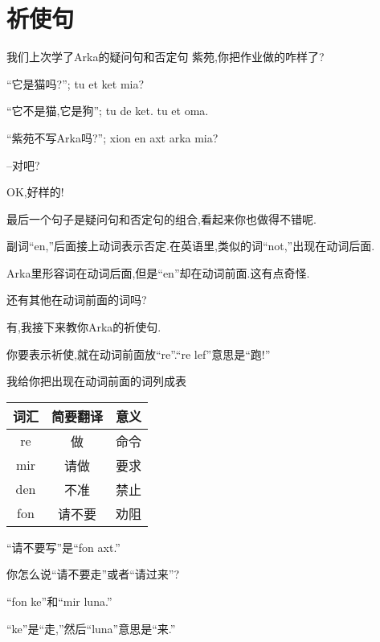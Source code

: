 \chapter[祈使句]{祈使句}

 
我们上次学了Arka的疑问句和否定句
紫苑,你把作业做的咋样了?


``它是猫吗?''; tu et ket mia?

``它不是猫,它是狗''; tu de ket. tu et oma.

``紫苑不写Arka吗?''; xion en axt arka mia?

--对吧?


OK,好样的!

最后一个句子是疑问句和否定句的组合,看起来你也做得不错呢.


副词``en,''后面接上动词表示否定.在英语里,类似的词``not,''出现在动词后面.

Arka里形容词在动词后面,但是``en''却在动词前面.这有点奇怪.

还有其他在动词前面的词吗?


有,我接下来教你Arka的祈使句.

你要表示祈使,就在动词前面放``re''.``re lef''意思是``跑!''

我给你把出现在动词前面的词列成表
\begin{table}
    \begin{tabular}{|c|c|c|} %
      \hline
	  \textbf{词汇} & \textbf{简要翻译} & \textbf{意义}\\
      \hline
      re&  做&  命令\\\hline
  mir&  请做&  要求\\\hline
  den&  不准&  禁止\\\hline
  fon&  请不要&  劝阻\\\hline
    \end{tabular}
\end{table}

``请不要写''是``fon axt.''

你怎么说``请不要走''或者``请过来''?


``fon ke''和``mir luna.''

``ke''是``走,''然后``luna''意思是``来.''


